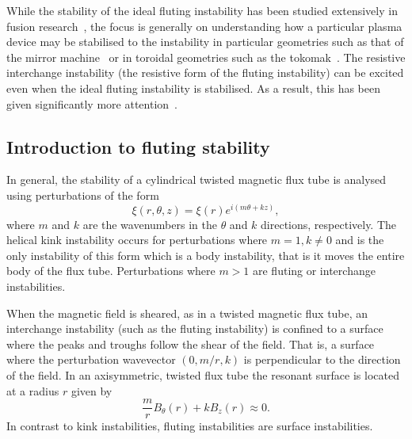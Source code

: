 While the stability of the ideal fluting instability has been studied extensively in fusion research~\cite{mikhailovskiiInstabilitiesConfinedPlasma1998,zhengAdvancedTokamakStability2015,wessonHydromagneticStabilityTokamaks1978}, the focus is generally on understanding how a particular plasma device may be stabilised to the instability in particular geometries such as that of the mirror machine~\cite{jungwirthTheoryFluteInstability1965} or in toroidal geometries such as the tokomak~\cite{shafranovFluteInstabilityCurrentcarrying1968}. The resistive interchange instability (the resistive form of the fluting instability) can be excited even when the ideal fluting instability is stabilised. As a result, this has been given significantly more attention~\cite{johnsonResistiveInterchangesNegativeV1967,correa-restrepoResistiveBallooningModes1983}.

\subsection{Introduction to fluting stability}

In general, the stability of a cylindrical twisted magnetic flux tube is analysed using perturbations of the form
\begin{equation}
  \label{eq:kink_perturbation}
\xi(r, \theta, z) = \xi(r) e^{i(m\theta + kz)},
\end{equation}
where $m$ and $k$ are the wavenumbers in the $\theta$ and $k$ directions, respectively. The helical kink instability occurs for perturbations where $m=1, k\ne0$ and is the only instability of this form which is a body instability, that is it moves the entire body of the flux tube. Perturbations where $m>1$ are fluting or interchange instabilities.

When the magnetic field is sheared, as in a twisted magnetic flux tube, an interchange instability (such as the fluting instability) is confined to a surface where the peaks and troughs follow the shear of the field. That is, a surface where the perturbation wavevector $(0, m/r, k)$ is perpendicular to the direction of the field. In an axisymmetric, twisted flux tube the resonant surface is located at a radius $r$ given by
\begin{equation}
  \label{eq:resonant_surface}
\frac{m}{r} B_{\theta}(r) + kB_z(r) \approx 0.
\end{equation}
In contrast to kink instabilities, fluting instabilities are surface instabilities.

